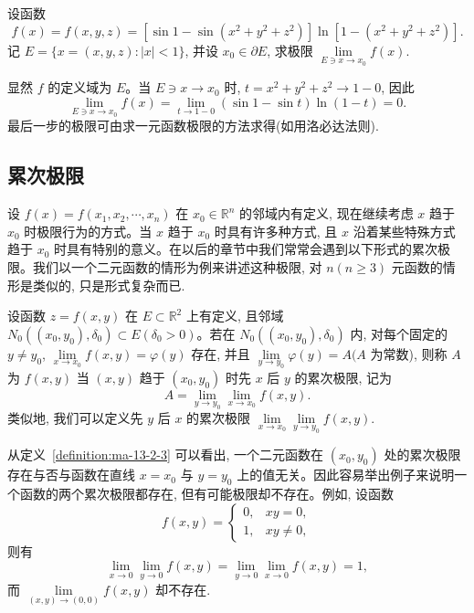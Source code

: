 \begin{example}\label{example:ma-13-2-5}
设函数
\[
  f(x)=f(x,y,z)=[\sin1-\sin(x^2+y^2+z^2)]\ln[1-(x^2+y^2+z^2)].
\]
记 $E=\{x=(x,y,z):|x|<1\}$, 并设 $x_0\in\partial E$, 求极限 $\lim\limits_{E\ni x\to x_0}f(x)$.
\end{example}


\begin{solve}
显然 $f$ 的定义域为 $E$。当 $E\ni x\to x_0$ 时, $t=x^2+y^2+z^2\to1-0$, 因此
\[
  \lim_{E\ni x\to x_0}f(x)
  =\lim_{t\to1-0}(\sin1-\sin t)\ln(1-t)=0.
\]
最后一步的极限可由求一元函数极限的方法求得(如用洛必达法则).
\end{solve}


\subsection{累次极限}
\label{subsec:ma-13-2-3}

设 $f(x)=f(x_1,x_2,\cdots,x_n)$ 在 $x_0\in\mathbb R^n$ 的邻域内有定义, 现在继续考虑 $x$ 趋于 $x_0$ 时极限行为的方式。当 $x$ 趋于 $x_0$ 时具有许多种方式, 且 $x$ 沿着某些特殊方式趋于 $x_0$ 时具有特别的意义。在以后的章节中我们常常会遇到以下形式的累次极限。我们以一个二元函数的情形为例来讲述这种极限, 对 $n(n\geqslant3)$ 元函数的情形是类似的, 只是形式复杂而已.

\begin{definition}\label{definition:ma-13-2-3}
设函数 $z=f(x,y)$ 在 $E\subset\mathbb R^2$ 上有定义, 且邻域 $N_0((x_0,y_0),\delta_0)\subset E(\delta_0>0)$。若在 $N_0((x_0,y_0),\delta_0)$ 内, 对每个固定的 $y\ne y_0$, $\lim\limits_{x\to x_0}f(x,y)=\varphi(y)$ 存在, 并且 $\lim\limits_{y\to y_0}\varphi(y)=A(A$ 为常数), 则称 $A$ 为 $f(x,y)$ 当 $(x,y)$ 趋于 $(x_0,y_0)$ 时先 $x$ 后 $y$ 的累次极限, 记为
\[
  A=\lim_{y\to y_0}\lim_{x\to x_0}f(x,y).
\]
类似地, 我们可以定义先 $y$ 后 $x$ 的累次极限 $\lim\limits_{x\to x_0}\lim\limits_{y\to y_0}f(x,y)$.
\end{definition}

从定义~\ref{definition:ma-13-2-3} 可以看出, 一个二元函数在 $(x_0,y_0)$ 处的累次极限存在与否与函数在直线 $x=x_0$ 与 $y=y_0$ 上的值无关。因此容易举出例子来说明一个函数的两个累次极限都存在, 但有可能极限却不存在。例如, 设函数
\[
  f(x,y)=
  \begin{cases}
    0, & xy=0,\\
    1, & xy\ne0,
  \end{cases}
\]
则有
\[
  \lim_{x\to0}\lim_{y\to0}f(x,y)
  =\lim_{y\to0}\lim_{x\to0}f(x,y)=1,
\]
而 $\lim\limits_{(x,y)\to(0,0)}f(x,y)$ 却不存在.

